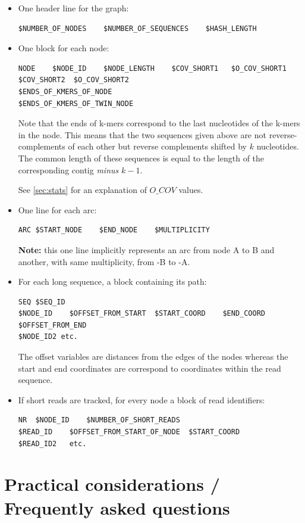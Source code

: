 \documentclass{article}
\begin{document}
\begin{itemize}
\item One header line for the graph: 
\begin{verbatim}
$NUMBER_OF_NODES    $NUMBER_OF_SEQUENCES    $HASH_LENGTH
\end{verbatim}

\item One block for each node:
\begin{verbatim}
NODE    $NODE_ID    $NODE_LENGTH	$COV_SHORT1   $O_COV_SHORT1  $COV_SHORT2  $O_COV_SHORT2
$ENDS_OF_KMERS_OF_NODE
$ENDS_OF_KMERS_OF_TWIN_NODE
\end{verbatim}

Note that the ends of k-mers correspond to the last nucleotides of the k-mers in the node. This means that the two sequences given above are not reverse-complements of each other but reverse complements shifted by $k$ nucleotides. The common length of these sequences is equal to the length of the corresponding contig \emph{minus} $k-1$.

See \ref{sec:stats} for an explanation of $O\_COV$ values.

\item One line for each arc:
\begin{verbatim}
ARC $START_NODE    $END_NODE    $MULTIPLICITY
\end{verbatim}

\textbf{Note:} this one line implicitly represents an arc from node A to B and another, with same multiplicity, from -B to -A.

\item For each long sequence, a block containing its path:
\begin{verbatim}
SEQ	$SEQ_ID
$NODE_ID	$OFFSET_FROM_START	$START_COORD	$END_COORD	$OFFSET_FROM_END
$NODE_ID2 etc.
\end{verbatim}

The offset variables are distances from the edges of the nodes whereas the start and end coordinates are correspond to coordinates within the read sequence.

\item If short reads are tracked, for every node a block of read identifiers:
\begin{verbatim}
NR	$NODE_ID	$NUMBER_OF_SHORT_READS
$READ_ID	$OFFSET_FROM_START_OF_NODE	$START_COORD
$READ_ID2	etc.
\end{verbatim}
\end{itemize}

\section{Practical considerations / Frequently asked questions} 
\end{document}
